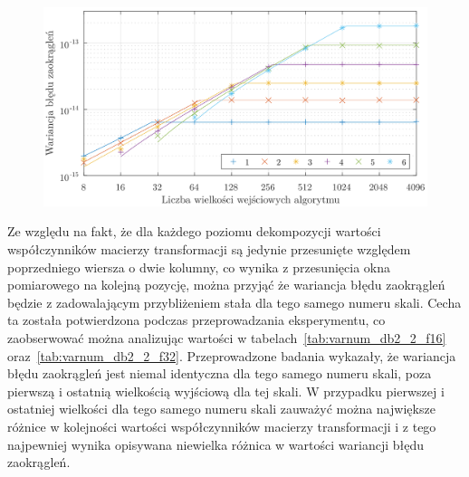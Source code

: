 \begin{figure}[htb!]
\begin{center}
\includegraphics{obrazki/dwt_rerror_coif5}
\end{center}
\end{figure}

Ze względu na fakt, że dla każdego poziomu dekompozycji wartości współczynników macierzy transformacji są jedynie przesunięte względem poprzedniego wiersza o dwie kolumny, co wynika z przesunięcia okna pomiarowego na kolejną pozycję, można przyjąć że wariancja błędu zaokrągleń będzie z zadowalającym przybliżeniem stała dla tego samego numeru skali. Cecha ta została potwierdzona podczas przeprowadzania eksperymentu, co zaobserwować można analizując wartości w tabelach~\ref{tab:varnum_db2_2_f16} oraz~\ref{tab:varnum_db2_2_f32}. Przeprowadzone badania wykazały, że wariancja błędu zaokrągleń jest niemal identyczna dla tego samego numeru skali, poza pierwszą i ostatnią wielkością wyjściową dla tej skali. W przypadku pierwszej i ostatniej wielkości dla tego samego numeru skali zauważyć można największe różnice w kolejności wartości współczynników macierzy transformacji i z tego najpewniej wynika opisywana niewielka różnica w wartości wariancji błędu zaokrągleń.

